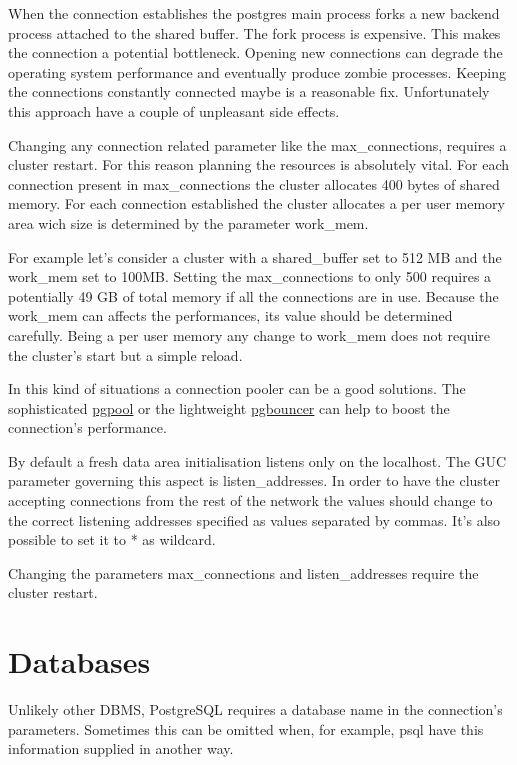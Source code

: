 When the connection establishes the postgres main process forks a new backend process attached to
the shared buffer. The fork process is expensive. This makes the connection a potential
bottleneck. Opening new connections can degrade the operating system performance and eventually
produce zombie processes. Keeping the connections constantly connected maybe is a reasonable fix.
Unfortunately this approach have a couple of unpleasant side effects.\newline

Changing any connection related parameter like the max\_connections, requires a cluster restart.
For this reason planning the resources is absolutely vital. For each connection present in
 max\_connections the cluster allocates 400 bytes of shared memory. For each connection established 
the cluster allocates a per user memory area wich size is determined by the parameter
work\_mem.\newline

For example let's consider a cluster with a shared\_buffer set to 512 MB and the work\_mem 
set to 100MB. Setting the max\_connections to only 500 requires a potentially 49 GB of total memory
if all the connections are in use. Because the work\_mem can affects the performances, its
value should be determined carefully. Being a per user memory any change to work\_mem does not
require the cluster's start but a simple reload.\newline 

In this kind of situations a connection pooler can be a good solutions. The sophisticated
\href{http://www.pgpool.net/}{pgpool}  or the
lightweight \href{http://pgfoundry.org/projects/pgbouncer/}{pgbouncer}  can help to boost the
connection's performance.\newline

By default a fresh data area initialisation listens only on the localhost. The GUC parameter
governing this aspect is listen\_addresses. In order to have the cluster accepting connections from
the rest of the network the values should change to the correct listening addresses specified
as values separated by commas. It's also possible to set it to * as wildcard.

Changing the parameters max\_connections and listen\_addresses require the cluster restart.



\section{Databases}
\label{sec:DATABASES}
Unlikely other DBMS, PostgreSQL requires a database name in the connection's parameters.
Sometimes this can be omitted when, for example, psql have this information supplied in
another way.\newline

